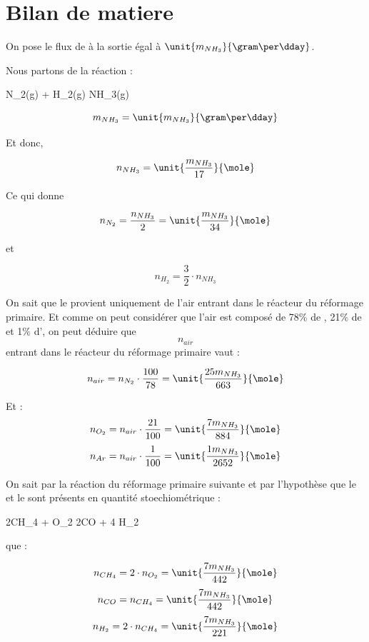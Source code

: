 \documentclass{article}
\begin{document}
\section{Bilan de matiere}
On pose le flux de  à la sortie égal à $\unit{m_{NH_3}}{\gram\per\dday}$. 

Nous partons de la réaction : 
\begin{chemmath}
		N_2(g) + H_2(g) \longrightarrow NH_3(g) 
\end{chemmath}
 	
$$m_{NH_3} = \unit{m_{NH_3}}{\gram\per\dday}$$ 

Et donc, 
 
$$n_{NH_3} = \unit{\frac{m_{NH_3}}{17}}{\mole}$$

Ce qui donne 

$$n_{N_2} = \frac{n_{NH_3}}{2} = \unit{\frac{m_{NH_3}}{34}}{\mole}$$ 

et 

$$n_{H_2} = \frac{3}{2} \cdot n_{NH_3}$$

On sait que le  provient uniquement de l'air entrant 
dans le réacteur du  réformage primaire. Et comme on peut considérer
que l'air est composé de 78\% de , 21\% de 
et 1\% d', on peut déduire que $$n_{air}$$ entrant dans le 
réacteur du réformage primaire vaut : 

$$n_{air}= n_{N_2} \cdot \frac{100}{78} = \unit{\frac{25m_{NH_3}}{663}}{\mole}$$ 

Et :
$$n_{O_2}= n_{air} \cdot \frac{21}{100} = \unit{\frac{7m_{NH_3}}{884}}{\mole}$$
$$n_{Ar}= n_{air} \cdot \frac{1}{100} = \unit{\frac{1m_{NH_3}}{2652}}{\mole}$$

On sait par la réaction du réformage primaire suivante et par l'hypothèse que le
 et le  sont présents en quantité stoechiométrique : 

\begin{chemmath}
	2CH_4 + O_2 \Longrightarrow 2CO + 4 H_2
\end{chemmath} 

que :

$$n_{CH_4} = 2 \cdot n_{O_2} = \unit{\frac{7m_{NH_3}}{442}}{\mole}$$
$$n_{CO} = n_{CH_4} =  \unit{\frac{7m_{NH_3}}{442}} {\mole}$$
$$n_{H_2} = 2 \cdot n_{CH_4} =  \unit{\frac{7m_{NH_3}}{221}}{\mole}$$
\end{document}
